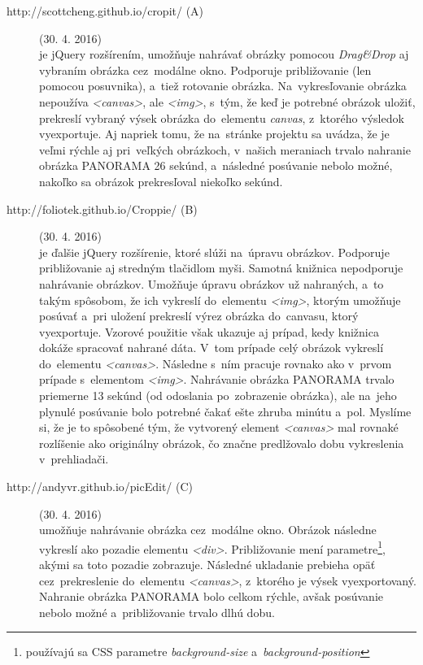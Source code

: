 \begin{description}
	
	\item[http://scottcheng.github.io/cropit/ (A)] (30. 4. 2016)\\
	je jQuery rozšírením, umožňuje nahrávať obrázky pomocou \emph{Drag\&Drop} aj vybraním obrázka cez~modálne okno. Podporuje približovanie (len pomocou posuvnika), a~tiež rotovanie obrázka. Na~vykresľovanie obrázka nepoužíva \emph{<canvas>}, ale \emph{<img>}, s~tým, že keď je potrebné obrázok uložiť, prekreslí vybraný výsek obrázka do~elementu \emph{canvas}, z~ktorého výsledok vyexportuje. Aj napriek tomu, že na~stránke projektu sa uvádza, že je veľmi rýchle aj pri~veľkých obrázkoch, v~našich meraniach trvalo nahranie obrázka PANORAMA 26 sekúnd, a~následné posúvanie nebolo možné, nakoľko sa obrázok prekresľoval niekoľko sekúnd.
	
	
	\item[http://foliotek.github.io/Croppie/ (B)] (30. 4. 2016)\\
	je ďalšie jQuery rozšírenie, ktoré slúži na~úpravu obrázkov. Podporuje približovanie aj stredným tlačidlom myši. Samotná knižnica nepodporuje nahrávanie obrázkov. Umožňuje úpravu obrázkov už nahraných, a~to takým spôsobom, že ich vykreslí do~elementu \emph{<img>}, ktorým umožňuje posúvať a~pri uložení prekreslí výrez obrázka do~canvasu, ktorý vyexportuje. Vzorové použitie však ukazuje aj prípad, kedy knižnica dokáže spracovať nahrané dáta. V~tom prípade celý obrázok vykreslí do~elementu \emph{<canvas>}. Následne s~ním pracuje rovnako ako v~prvom prípade s~elementom \emph{<img>}. Nahrávanie obrázka PANORAMA trvalo priemerne 13 sekúnd (od odoslania po~zobrazenie obrázka), ale na~jeho plynulé posúvanie bolo potrebné čakať ešte zhruba minútu a~pol. Myslíme si, že je to spôsobené tým, že vytvorený element \emph{<canvas>} mal rovnaké rozlíšenie ako originálny obrázok, čo značne predlžovalo dobu vykreslenia v~prehliadači.
	
	
	\item[http://andyvr.github.io/picEdit/ (C)] (30. 4. 2016)\\
	umožňuje nahrávanie obrázka cez~modálne okno. Obrázok následne vykreslí ako pozadie elementu \emph{<div>}. Približovanie mení parametre\footnote{používajú sa CSS parametre \emph{background-size} a~\emph{background-position}}, akými sa toto pozadie zobrazuje. Následné ukladanie prebieha opäť cez~prekreslenie do~elementu \emph{<canvas>}, z~ktorého je výsek vyexportovaný. Nahranie obrázka PANORAMA bolo celkom rýchle, avšak posúvanie nebolo možné a~približovanie trvalo dlhú dobu.
	

\end{description}
